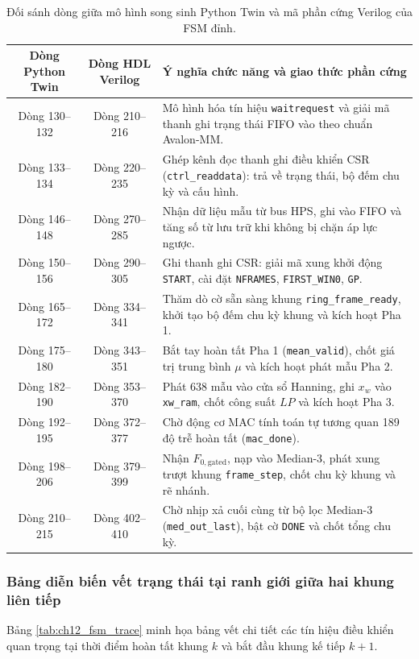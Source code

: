 \begin{table}[htbp]
\centering
\small
\caption{Đối sánh dòng giữa mô hình song sinh Python Twin và mã phần cứng Verilog của FSM đỉnh.}
\label{tab:ch12_twin_hdl_compare}
\begin{tabularx}{\linewidth}{|c|c|X|}
\hline
\textbf{Dòng Python Twin} & \textbf{Dòng HDL Verilog} & \textbf{Ý nghĩa chức năng và giao thức phần cứng} \\
\hline
Dòng 130--132 & Dòng 210--216 & Mô hình hóa tín hiệu \texttt{waitrequest} và giải mã thanh ghi trạng thái FIFO vào theo chuẩn Avalon-MM. \\
\hline
Dòng 133--134 & Dòng 220--235 & Ghép kênh đọc thanh ghi điều khiển CSR (\texttt{ctrl\_readdata}): trả về trạng thái, bộ đếm chu kỳ và cấu hình. \\
\hline
Dòng 146--148 & Dòng 270--285 & Nhận dữ liệu mẫu từ bus HPS, ghi vào FIFO và tăng số từ lưu trữ khi không bị chặn áp lực ngược. \\
\hline
Dòng 150--156 & Dòng 290--305 & Ghi thanh ghi CSR: giải mã xung khởi động \texttt{START}, cài đặt \texttt{NFRAMES}, \texttt{FIRST\_WIN0}, \texttt{GP}. \\
\hline
Dòng 165--172 & Dòng 334--341 & Thăm dò cờ sẵn sàng khung \texttt{ring\_frame\_ready}, khởi tạo bộ đếm chu kỳ khung và kích hoạt Pha 1. \\
\hline
Dòng 175--180 & Dòng 343--351 & Bắt tay hoàn tất Pha 1 (\texttt{mean\_valid}), chốt giá trị trung bình $\mu$ và kích hoạt phát mẫu Pha 2. \\
\hline
Dòng 182--190 & Dòng 353--370 & Phát 638 mẫu vào cửa sổ Hanning, ghi $x_w$ vào \texttt{xw\_ram}, chốt công suất $LP$ và kích hoạt Pha 3. \\
\hline
Dòng 192--195 & Dòng 372--377 & Chờ động cơ MAC tính toán tự tương quan 189 độ trễ hoàn tất (\texttt{mac\_done}). \\
\hline
Dòng 198--206 & Dòng 379--399 & Nhận $F_{0,\text{gated}}$, nạp vào Median-3, phát xung trượt khung \texttt{frame\_step}, chốt chu kỳ khung và rẽ nhánh. \\
\hline
Dòng 210--215 & Dòng 402--410 & Chờ nhịp xả cuối cùng từ bộ lọc Median-3 (\texttt{med\_out\_last}), bật cờ \texttt{DONE} và chốt tổng chu kỳ. \\
\hline
\end{tabularx}
\end{table}

\subsubsection*{Bảng diễn biến vết trạng thái tại ranh giới giữa hai khung liên tiếp}
Bảng \ref{tab:ch12_fsm_trace} minh họa bảng vết chi tiết các tín hiệu điều khiển quan trọng tại thời điểm hoàn tất khung $k$ và bắt đầu khung kế tiếp $k+1$.

